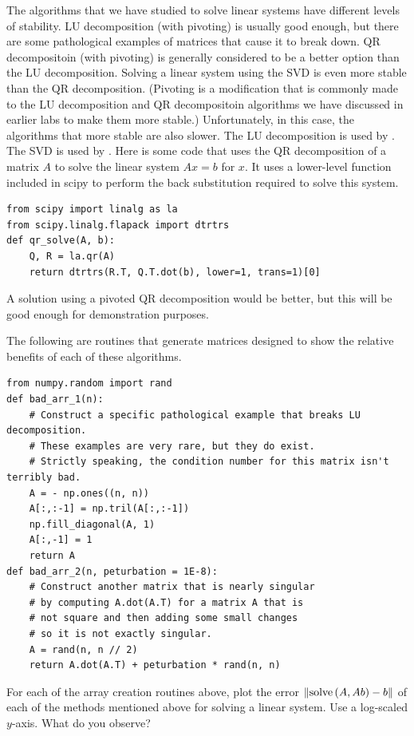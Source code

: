 The algorithms that we have studied to solve linear systems have different levels of stability.
LU decomposition (with pivoting) is usually good enough, but there are some pathological examples of matrices that cause it to break down.
QR decompositoin (with pivoting) is generally considered to be a better option than the LU decomposition.
Solving a linear system using the SVD is even more stable than the QR decomposition.
(Pivoting is a modification that is commonly made to the LU decomposition and QR decompositoin algorithms we have discussed in earlier labs to make them more stable.)
Unfortunately, in this case, the algorithms that more stable are also slower.
The LU decomposition is used by .
The SVD is used by .
Here is some code that uses the QR decomposition of a matrix $A$ to solve the linear system $A x = b$ for $x$.
It uses a lower-level function included in scipy to perform the back substitution required to solve this system.
\begin{lstlisting}
from scipy import linalg as la
from scipy.linalg.flapack import dtrtrs
def qr_solve(A, b):
    Q, R = la.qr(A)
    return dtrtrs(R.T, Q.T.dot(b), lower=1, trans=1)[0]
\end{lstlisting}
A solution using a pivoted QR decomposition would be better, but this will be good enough for demonstration purposes.

The following are routines that generate matrices designed to show the relative benefits of each of these algorithms.
\begin{lstlisting}
from numpy.random import rand
def bad_arr_1(n):
    # Construct a specific pathological example that breaks LU decomposition.
    # These examples are very rare, but they do exist.
    # Strictly speaking, the condition number for this matrix isn't terribly bad.
    A = - np.ones((n, n))
    A[:,:-1] = np.tril(A[:,:-1])
    np.fill_diagonal(A, 1)
    A[:,-1] = 1
    return A
def bad_arr_2(n, peturbation = 1E-8):
    # Construct another matrix that is nearly singular
    # by computing A.dot(A.T) for a matrix A that is
    # not square and then adding some small changes
    # so it is not exactly singular.
    A = rand(n, n // 2)
    return A.dot(A.T) + peturbation * rand(n, n)
\end{lstlisting}

\begin{problem}
For each of the array creation routines above, plot the error $\left\lVert\text{solve}\left(A, A b\right) - b\right\rVert$ of each of the methods mentioned above for solving a linear system.
Use a log-scaled $y$-axis.
What do you observe?
\end{problem}

